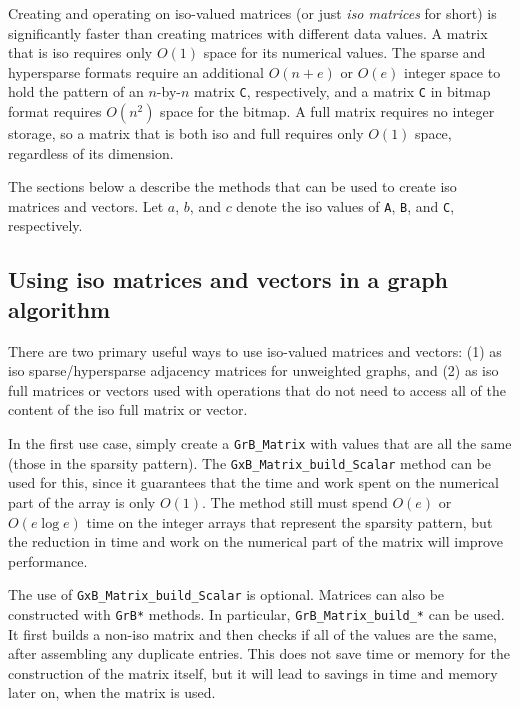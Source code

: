 \documentclass[12pt]{article}
\begin{document}
Creating and operating on iso-valued matrices (or just {\em iso matrices} for
short) is significantly faster than creating matrices with different data
values.  A matrix that is iso requires only $O(1)$ space for its numerical
values.  The sparse and hypersparse formats require an additional $O(n+e)$ or
$O(e)$ integer space to hold the pattern of an $n$-by-$n$ matrix \verb'C',
respectively, and a matrix \verb'C' in bitmap format requires $O(n^2)$ space
for the bitmap.  A full matrix requires no integer storage, so a matrix that is
both iso and full requires only $O(1)$ space, regardless of its dimension.

The sections below a describe the methods that can be used to create iso
matrices and vectors.  Let $a$, $b$, and $c$ denote the iso values of \verb'A',
\verb'B', and \verb'C', respectively.

\subsection{Using iso matrices and vectors in a graph algorithm}
\label{iso_usage}

There are two primary useful ways to use iso-valued matrices and vectors: (1)
as iso sparse/hypersparse adjacency matrices for unweighted graphs, and (2) as
iso full matrices or vectors used with operations that do not need to access
all of the content of the iso full matrix or vector.

In the first use case, simply create a \verb'GrB_Matrix' with values that are
all the same (those in the sparsity pattern).  The
\verb'GxB_Matrix_build_Scalar' method can be used for this, since it
guarantees that the time and work spent on the numerical part of the array
is only $O(1)$.  The method still must spend $O(e)$ or $O(e \log e)$ time
on the integer arrays that represent the sparsity pattern, but the reduction
in time and work on the numerical part of the matrix will improve performance.

The use of \verb'GxB_Matrix_build_Scalar' is optional.  Matrices can also be
constructed with \verb'GrB*' methods.  In particular, \verb'GrB_Matrix_build_*'
can be used.  It first builds a non-iso matrix and then checks if all of the
values are the same, after assembling any duplicate entries.  This does not
save time or memory for the construction of the matrix itself, but it will
lead to savings in time and memory later on, when the matrix is used.
\end{document}
